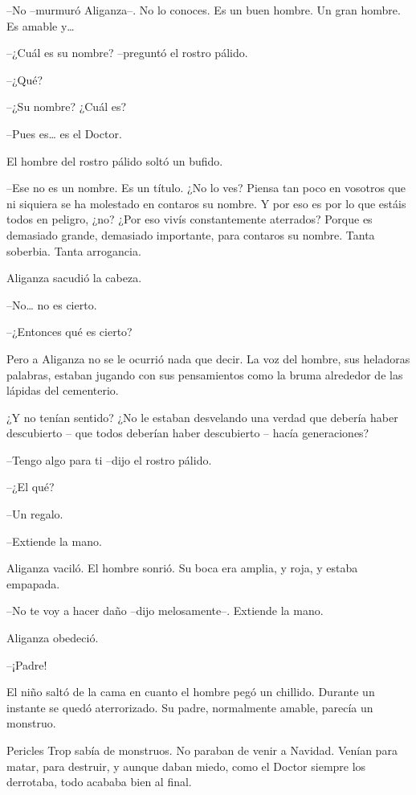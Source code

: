 --No --murmuró Aliganza--. No lo conoces. Es un buen hombre. Un gran hombre. Es amable y…

--¿Cuál es su nombre? --preguntó el rostro pálido.

--¿Qué?

--¿Su nombre? ¿Cuál es?

--Pues es… es el Doctor.

El hombre del rostro pálido soltó un bufido.

--Ese no es un nombre. Es un título. ¿No lo ves? Piensa tan poco en vosotros que ni siquiera se ha molestado en contaros su nombre. Y por eso es por lo que estáis todos en peligro, ¿no? ¿Por eso vivís constantemente aterrados? Porque es demasiado grande, demasiado importante, para contaros su nombre. Tanta soberbia. Tanta arrogancia.

Aliganza sacudió la cabeza.

--No… no es cierto.

--¿Entonces qué es cierto?

Pero a Aliganza no se le ocurrió nada que decir. La voz del hombre, sus heladoras palabras, estaban jugando con sus pensamientos como la bruma alrededor de las lápidas del cementerio.

¿Y no tenían sentido? ¿No le estaban desvelando una verdad que debería haber descubierto – que todos deberían haber descubierto – hacía generaciones?

--Tengo algo para ti --dijo el rostro pálido.

--¿El qué?

--Un regalo.

--Extiende la mano.

Aliganza vaciló. El hombre sonrió. Su boca era amplia, y roja, y estaba empapada.

--No te voy a hacer daño --dijo melosamente--. Extiende la mano.

Aliganza obedeció.

\mbox{}

\centerline{ \Huge *}

\mbox{}


--¡Padre!

El niño saltó de la cama en cuanto el hombre pegó un chillido. Durante un instante se quedó aterrorizado. Su padre, normalmente amable, parecía un monstruo.

Pericles Trop sabía de monstruos. No paraban de venir a Navidad. Venían para matar, para destruir, y aunque daban miedo, como el Doctor siempre los derrotaba, todo acababa bien al final.

